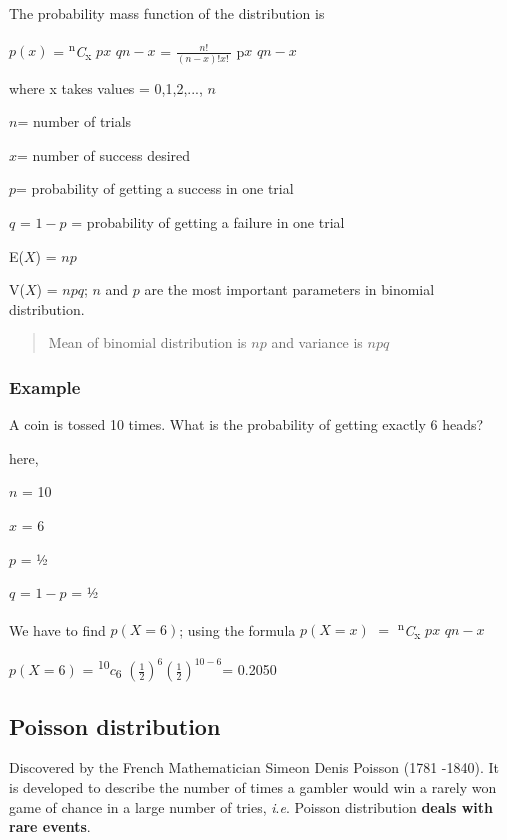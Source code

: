 \documentclass[
]{book}
\begin{document}
The probability mass function of the distribution is

\(p(x)\) = \textsuperscript{n}\emph{C}\textsubscript{x} \(p\)\(x\) \(q\)\(n-x\) =
\(\frac{n!}{\left( n - x \right)!x!\ }\) p\(x\) \(q\)\(n-x\)

where x takes values = 0,1,2,..., \(n\)

\(n\)= number of trials

\(x\)= number of success desired

\(p\)= probability of getting a success in one trial

\(q\) = \(1-p\) = probability of getting a failure in one trial

E(\(X\)) = \(np\)

V(\(X\)) = \(npq\); \(n\) and \(p\) are the most important parameters in
binomial distribution.

\begin{quote}
Mean of binomial distribution is \(np\) and variance is \(npq\)
\end{quote}

\hypertarget{example-7}{%
\subsubsection*{Example}\label{example-7}}

A coin is tossed 10 times. What is the probability of getting exactly 6
heads?

here,

\(n\) = 10

\(x\) = 6

\(p\) = ½

\(q\) = \(1-p\) = ½

We have to find \(p(X=6)\); using the formula \(p(X=x)\) \(=\) \textsuperscript{n}\emph{C}\textsubscript{x}
\(p\)\(x\) \(q\)\(n-x\)

\(p(X=6)\) = \textsuperscript{10}\(c\)\textsubscript{6}
\(\left( \frac{1}{2} \right)^{6}\left( \frac{1}{2} \right)^{10 - 6}\)=
0.2050

\hypertarget{poisson-distribution}{%
\subsection{Poisson distribution}\label{poisson-distribution}}

Discovered by the French Mathematician Simeon Denis Poisson (1781
-1840). It is developed to describe the number of times a gambler would
win a rarely won game of chance in a large number of tries, \emph{i}.\emph{e}. Poisson
distribution \textbf{deals with rare events}.
\end{document}
